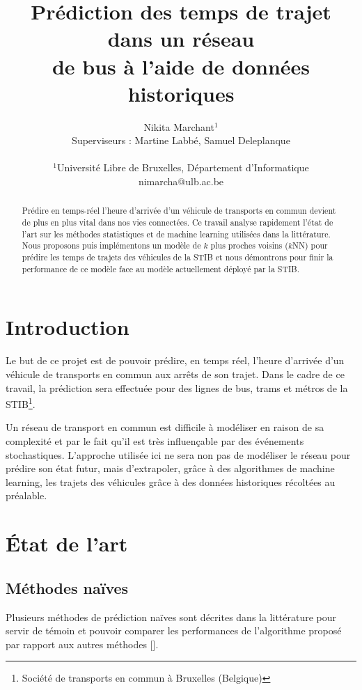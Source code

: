 \documentclass[letterpaper]{article}
\title{Prédiction des temps de trajet dans un réseau\\ de bus à l'aide de données historiques}
\author{Nikita Marchant$^{1}$\\
Superviseurs : Martine Labbé, Samuel Deleplanque
\mbox{}\\\\
$^1$Université Libre de Bruxelles, Département d'Informatique\\
nimarcha@ulb.ac.be}
\begin{document}
\maketitle

\begin{abstract}

Prédire en temps-réel l'heure d'arrivée d'un véhicule de transports en commun devient de plus en plus vital dans nos vies connectées. Ce travail analyse rapidement l'état de l'art sur les méthodes statistiques et de machine learning utilisées dans la littérature. Nous proposons puis implémentons un modèle de $k$ plus proches voisins ($k$NN) pour prédire les temps de trajets des véhicules de la STIB et nous démontrons pour finir la performance de ce modèle face au modèle actuellement déployé par la STIB.

\end{abstract}

\section{Introduction}

Le but de ce projet est de pouvoir prédire, en temps réel, l'heure d'arrivée d'un véhicule de transports en commun aux arrêts de son trajet.
Dans le cadre de ce travail, la prédiction sera effectuée pour des lignes de bus,
trams et métros de la STIB\footnote{Société de transports en commun à Bruxelles (Belgique)}.

Un réseau de transport en commun est difficile à modéliser en raison de sa complexité et par le fait qu'il est très influençable par des événements stochastiques. L'approche utilisée ici ne sera non pas de modéliser le réseau pour prédire son état futur, mais d'extrapoler, grâce à des algorithmes de machine learning, les trajets des véhicules grâce à des données historiques récoltées au préalable.


\section{État de l'art}

\subsection{Méthodes naïves}

Plusieurs méthodes de prédiction naïves sont décrites dans la littérature pour servir de témoin et pouvoir comparer les performances de l'algorithme proposé par rapport aux autres méthodes [\cite{Altinkaya2013}].
\end{document}
